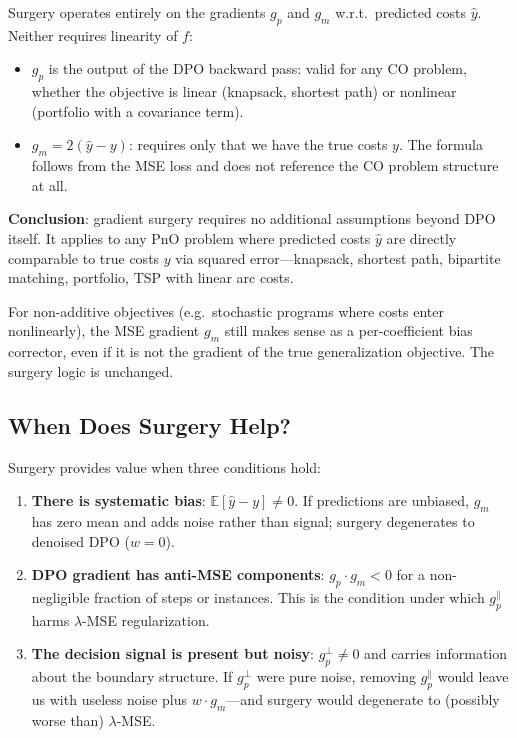 \documentclass[11pt]{article}
\begin{document}
Surgery operates entirely on the gradients $g_p$ and $g_m$ w.r.t.\ predicted
costs $\hat{y}$.  Neither requires linearity of $f$:
\begin{itemize}[itemsep=2pt]
  \item $g_p$ is the output of the DPO backward pass: valid for any CO problem,
        whether the objective is linear (knapsack, shortest path) or nonlinear
        (portfolio with a covariance term).
  \item $g_m = 2(\hat{y} - y)$: requires only that we have the true costs $y$.
        The formula follows from the MSE loss and does not reference the CO problem
        structure at all.
\end{itemize}

\textbf{Conclusion}: gradient surgery requires no additional assumptions beyond
DPO itself.  It applies to any PnO problem where predicted costs $\hat{y}$ are
directly comparable to true costs $y$ via squared error---knapsack, shortest
path, bipartite matching, portfolio, TSP with linear arc costs.

For non-additive objectives (e.g.\ stochastic programs where costs enter
nonlinearly), the MSE gradient $g_m$ still makes sense as a per-coefficient bias
corrector, even if it is not the gradient of the true generalization objective.
The surgery logic is unchanged.

\subsection{When Does Surgery Help?}

Surgery provides value when three conditions hold:
\begin{enumerate}[itemsep=2pt]
  \item \textbf{There is systematic bias}: $\mathbb{E}[\hat{y} - y] \neq 0$.
        If predictions are unbiased, $g_m$ has zero mean and adds noise rather
        than signal; surgery degenerates to denoised DPO ($w = 0$).

  \item \textbf{DPO gradient has anti-MSE components}: $g_p \cdot g_m < 0$ for
        a non-negligible fraction of steps or instances.  This is the condition
        under which $g_p^{\parallel}$ harms $\lambda$-MSE regularization.

  \item \textbf{The decision signal is present but noisy}: $g_p^{\perp} \neq 0$
        and carries information about the boundary structure.  If $g_p^{\perp}$
        were pure noise, removing $g_p^{\parallel}$ would leave us with useless
        noise plus $w \cdot g_m$---and surgery would degenerate to (possibly worse
        than) $\lambda$-MSE.
\end{enumerate}
\end{document}
